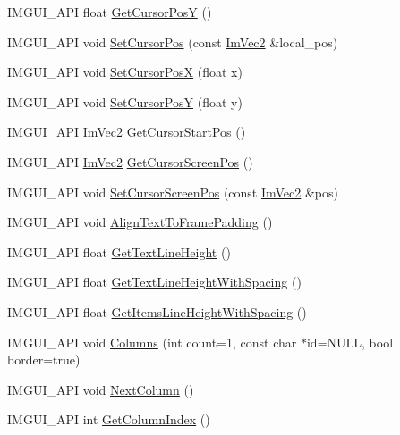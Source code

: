 \begin{DoxyCompactItemize}
\item 
I\+M\+G\+U\+I\+\_\+\+A\+PI float \hyperlink{namespace_im_gui_a86e409551f256b542166989c558d41c1}{Get\+Cursor\+PosY} ()
\item 
I\+M\+G\+U\+I\+\_\+\+A\+PI void \hyperlink{namespace_im_gui_a51ea13c986360d8a2e868dc9eeac2115}{Set\+Cursor\+Pos} (const \hyperlink{struct_im_vec2}{Im\+Vec2} \&local\+\_\+pos)
\item 
I\+M\+G\+U\+I\+\_\+\+A\+PI void \hyperlink{namespace_im_gui_a8f56616f8d0b35e6e756c0b7f198ac0f}{Set\+Cursor\+PosX} (float x)
\item 
I\+M\+G\+U\+I\+\_\+\+A\+PI void \hyperlink{namespace_im_gui_a0174d351957d5c5677ebc214dd54f499}{Set\+Cursor\+PosY} (float y)
\item 
I\+M\+G\+U\+I\+\_\+\+A\+PI \hyperlink{struct_im_vec2}{Im\+Vec2} \hyperlink{namespace_im_gui_a8ee9647de3b39fc7b77395082fc9e0cc}{Get\+Cursor\+Start\+Pos} ()
\item 
I\+M\+G\+U\+I\+\_\+\+A\+PI \hyperlink{struct_im_vec2}{Im\+Vec2} \hyperlink{namespace_im_gui_adb0db3c1ee36f5085f35890a4229ae75}{Get\+Cursor\+Screen\+Pos} ()
\item 
I\+M\+G\+U\+I\+\_\+\+A\+PI void \hyperlink{namespace_im_gui_a632bc7e15b8258f95ab0bc9b2efd5537}{Set\+Cursor\+Screen\+Pos} (const \hyperlink{struct_im_vec2}{Im\+Vec2} \&pos)
\item 
I\+M\+G\+U\+I\+\_\+\+A\+PI void \hyperlink{namespace_im_gui_ae14be3a3bec106de7c91aaa2a9a558a1}{Align\+Text\+To\+Frame\+Padding} ()
\item 
I\+M\+G\+U\+I\+\_\+\+A\+PI float \hyperlink{namespace_im_gui_aaba5637199d31ea23d4d143b30a44aff}{Get\+Text\+Line\+Height} ()
\item 
I\+M\+G\+U\+I\+\_\+\+A\+PI float \hyperlink{namespace_im_gui_aa1616f6082fd210fde8d98c511bf8f56}{Get\+Text\+Line\+Height\+With\+Spacing} ()
\item 
I\+M\+G\+U\+I\+\_\+\+A\+PI float \hyperlink{namespace_im_gui_a85a5202a65c0663858dba55a206761c5}{Get\+Items\+Line\+Height\+With\+Spacing} ()
\item 
I\+M\+G\+U\+I\+\_\+\+A\+PI void \hyperlink{namespace_im_gui_a0e2889956542527c4039b6b8bf5c2a38}{Columns} (int count=1, const char $\ast$id=N\+U\+LL, bool border=true)
\item 
I\+M\+G\+U\+I\+\_\+\+A\+PI void \hyperlink{namespace_im_gui_a8f97746d6a9d59c8400c26fb7613a2ff}{Next\+Column} ()
\item 
I\+M\+G\+U\+I\+\_\+\+A\+PI int \hyperlink{namespace_im_gui_acc31f8eea4fcfb86edeb3ac12d82fc05}{Get\+Column\+Index} ()

\end{DoxyCompactItemize}
